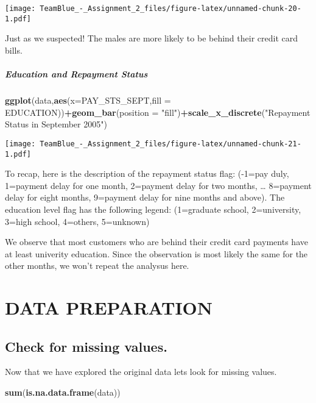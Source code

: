 \documentclass[]{article}
\newenvironment{Shaded}{\begin{snugshade}}{\end{snugshade}}
\newcommand{\KeywordTok}[1]{\textcolor[rgb]{0.13,0.29,0.53}{\textbf{#1}}}
\newcommand{\DataTypeTok}[1]{\textcolor[rgb]{0.13,0.29,0.53}{#1}}
\newcommand{\StringTok}[1]{\textcolor[rgb]{0.31,0.60,0.02}{#1}}
\newcommand{\OperatorTok}[1]{\textcolor[rgb]{0.81,0.36,0.00}{\textbf{#1}}}
\newcommand{\NormalTok}[1]{#1}
\let\oldsubparagraph\subparagraph
\renewcommand{\subparagraph}[1]{\oldsubparagraph{#1}\mbox{}}
\begin{document}
\texttt{[image: TeamBlue\_-\_Assignment\_2\_files/figure-latex/unnamed-chunk-20-1.pdf]}

Just as we suspected! The males are more likely to be behind their
credit card bills.

\subparagraph{Education and Repayment
Status}\label{education-and-repayment-status}

\begin{Shaded}
\begin{Highlighting}[]
\KeywordTok{ggplot}\NormalTok{(data,}\KeywordTok{aes}\NormalTok{(}\DataTypeTok{x=}\NormalTok{PAY_STS_SEPT,}\DataTypeTok{fill =}\NormalTok{ EDUCATION))}\OperatorTok{+}\KeywordTok{geom_bar}\NormalTok{(}\DataTypeTok{position =} \StringTok{"fill"}\NormalTok{)}\OperatorTok{+}\KeywordTok{scale_x_discrete}\NormalTok{(}\StringTok{"Repayment Status in September 2005"}\NormalTok{)}
\end{Highlighting}
\end{Shaded}

\texttt{[image: TeamBlue\_-\_Assignment\_2\_files/figure-latex/unnamed-chunk-21-1.pdf]}

To recap, here is the description of the repayment status flag: (-1=pay
duly, 1=payment delay for one month, 2=payment delay for two months,
\ldots{} 8=payment delay for eight months, 9=payment delay for nine
months and above). The education level flag has the following legend:
(1=graduate school, 2=university, 3=high school, 4=others, 5=unknown)

We observe that most customers who are behind their credit card payments
have at least univerity education. Since the observation is most likely
the same for the other months, we won't repeat the analysus here.

\section{DATA PREPARATION}\label{data-preparation}

\subsection{Check for missing values.}\label{check-for-missing-values.}

Now that we have explored the original data lets look for missing
values.

\begin{Shaded}
\begin{Highlighting}[]
\KeywordTok{sum}\NormalTok{(}\KeywordTok{is.na.data.frame}\NormalTok{(data))}
\end{Highlighting}
\end{Shaded}
\end{document}
